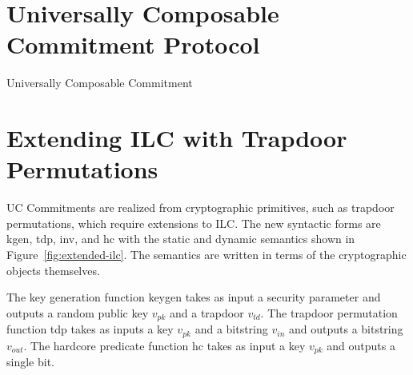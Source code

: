 \section{Universally Composable Commitment Protocol}
\begin{algorithm}
\DontPrintSemicolon

\smallskip
{}
\smallskip

\caption{Universally Composable Commitment}
\label{alg:com}
\end{algorithm}

\section{Extending ILC with Trapdoor Permutations}

UC Commitments are realized from cryptographic primitives, such as trapdoor
permutations, which require extensions to ILC. The new syntactic forms are
\textsf{kgen}, \textsf{tdp}, \textsf{inv}, and \textsf{hc} with the static and
dynamic semantics shown in Figure~\ref{fig:extended-ilc}. The semantics are
written in terms of the cryptographic objects themselves.

 The key generation function
\textsf{keygen} takes as input a security parameter and outputs a random public
key $v_{pk}$ and a trapdoor $v_{td}$. The trapdoor permutation function
\textsf{tdp} takes as inputs a key $v_{pk}$ and a bitstring $v_{in}$ and outputs
a bitstring $v_{out}$.  The hardcore predicate function
\textsf{hc} takes as input a key $v_{pk}$ and outputs a single bit. 



